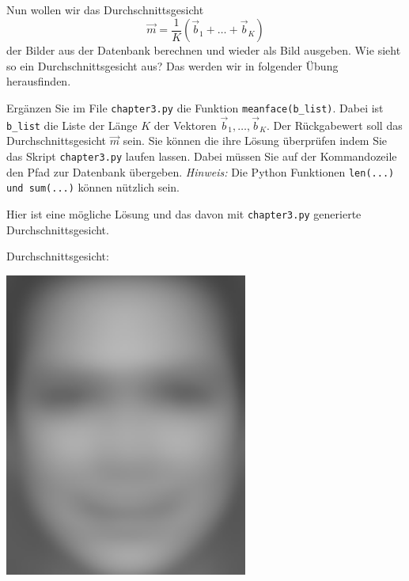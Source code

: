 Nun wollen wir das Durchschnittsgesicht
\begin{equation*}
	\vec m=\frac{1}{K}\left(\vec b_1+\ldots+\vec b_K\right)
\end{equation*}
der Bilder aus der Datenbank berechnen und wieder als Bild ausgeben.
Wie sieht so ein Durchschnittsgesicht aus?
Das werden wir in folgender Übung herausfinden.
\begin{aufgabe} \label{aufg:meanface}
	Ergänzen Sie im File \texttt{chapter3.py} die Funktion \texttt{meanface(b\_list)}.
	Dabei ist \texttt{b\_list} die Liste der Länge $K$ der Vektoren $\vec b_1,\ldots,\vec b_K$.
	Der Rückgabewert soll das Durchschnittsgesicht $\vec m$ sein.
	Sie können die ihre Lösung überprüfen indem Sie das Skript \texttt{chapter3.py} laufen lassen.
	Dabei müssen Sie auf der Kommandozeile den Pfad zur Datenbank übergeben.
	\textit{Hinweis:} Die Python Funktionen \texttt{len(...) und sum(...)} können nützlich sein.
\end{aufgabe}
\begin{losung}
	Hier ist eine mögliche Lösung und das davon mit \texttt{chapter3.py} generierte Durchschnittsgesicht.\\[0.5cm]
	\begin{minipage}{0.45\textwidth}

	\end{minipage}\hfill
	\begin{minipage}{0.3\textwidth}\vspace{-1cm}
		\centering\hfill Durchschnittsgesicht:
	\end{minipage}
	\begin{minipage}{0.2\textwidth}\vspace{-1cm}
		\centering\includegraphics[width=0.6\textwidth]{images/facespace/meanface}
	\end{minipage}
\end{losung}
